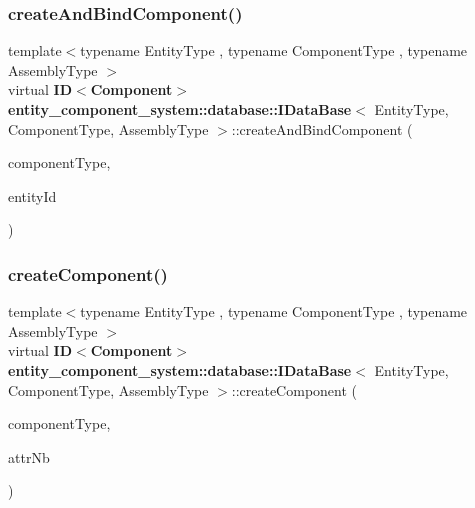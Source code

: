 \label{classentity__component__system_1_1database_1_1_i_data_base_ac3b147adcd7971a7925affabb81ee6bb} 
\subsubsection{create\+And\+Bind\+Component()}
{\footnotesize\ttfamily template$<$typename Entity\+Type , typename Component\+Type , typename Assembly\+Type $>$ \\
virtual {\bf ID}$<${\bf Component}$>$ {\bf entity\+\_\+component\+\_\+system\+::database\+::\+I\+Data\+Base}$<$ Entity\+Type, Component\+Type, Assembly\+Type $>$\+::create\+And\+Bind\+Component (\begin{DoxyParamCaption}\item[{Component\+Type const}]{component\+Type,  }\item[{{\bf ID}$<$ Entity $>$ const \&}]{entity\+Id }\end{DoxyParamCaption})\hspace{0.3cm}{\ttfamily [pure virtual]}}

\label{classentity__component__system_1_1database_1_1_i_data_base_a7015be247d4bbc4497c6965c7f29af2a} 
\subsubsection{create\+Component()}
{\footnotesize\ttfamily template$<$typename Entity\+Type , typename Component\+Type , typename Assembly\+Type $>$ \\
virtual {\bf ID}$<${\bf Component}$>$ {\bf entity\+\_\+component\+\_\+system\+::database\+::\+I\+Data\+Base}$<$ Entity\+Type, Component\+Type, Assembly\+Type $>$\+::create\+Component (\begin{DoxyParamCaption}\item[{Component\+Type const}]{component\+Type,  }\item[{unsigned const}]{attr\+Nb }\end{DoxyParamCaption})\hspace{0.3cm}{\ttfamily [pure virtual]}}

